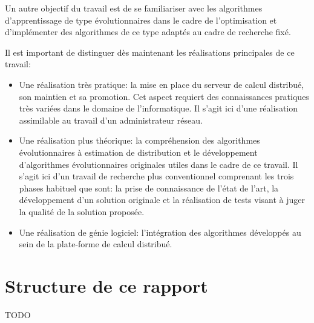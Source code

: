 \documentclass[a4paper, 11pt]{report}
\begin{document}
Un autre objectif du travail est de se familiariser avec les algorithmes d'apprentissage de type évolutionnaires dans le cadre de l'optimisation et d'implémenter des algorithmes de ce type adaptés au cadre de recherche fixé.

Il est important de distinguer dès maintenant les réalisations principales de ce travail:
\begin{itemize}
\item Une réalisation très pratique: la mise en place du serveur de calcul distribué, son maintien et sa promotion. Cet aspect requiert des connaissances pratiques très variées dans le domaine de l'informatique. Il s'agit ici d'une réalisation assimilable au travail d'un administrateur réseau.
\item Une réalisation plus théorique: la compréhension des algorithmes évolutionnaires à estimation de distribution et le développement d'algorithmes évolutionnaires originales utiles dans le cadre de ce travail. Il s'agit ici d'un travail de recherche plus conventionnel comprenant les trois phases habituel que sont: la prise de connaissance de l'état de l'art, la développement d'un solution originale et la réalisation de tests visant à juger la qualité de la solution proposée.
\item Une réalisation de génie logiciel: l'intégration des algorithmes développés au sein de la plate-forme de calcul distribué. 
\end{itemize}

\section{Structure de ce rapport}
TODO



%
\end{document}
